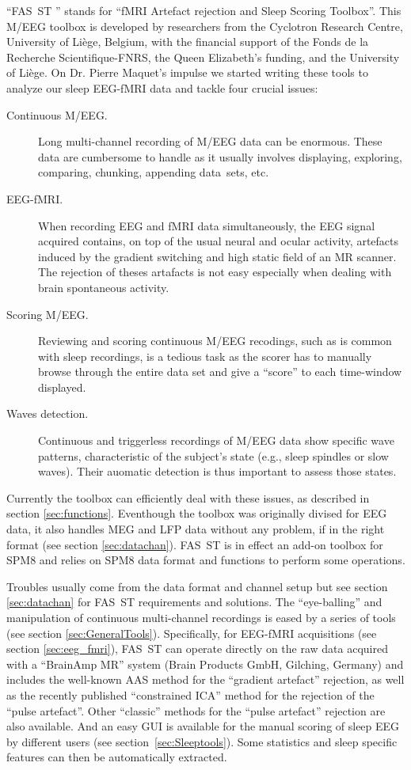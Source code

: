 \documentclass[a4paper,titlepage]{article}
\def\dblS{\hbox{S\hskip -4.5pt S}}
\newcommand{\fasst}{FA\dblS T } 	%
\begin{document}
``\fasst\hspace{-4pt}'' stands for ``fMRI Artefact rejection and Sleep Scoring Toolbox''. This M/EEG toolbox is developed by researchers from the Cyclotron Research Centre, University of Li\`ege, Belgium, with the financial support of the Fonds de la Recherche Scientifique-FNRS, the Queen Elizabeth's funding, and the University of Li\`ege.
On Dr. Pierre Maquet's impulse we started writing these tools to analyze our sleep EEG-fMRI data and tackle four crucial issues:
\begin{description}
	\item[Continuous M/EEG.]Long multi-channel recording of M/EEG data can be enormous. These data are cumbersome to handle as it usually involves displaying, exploring, comparing, chunking, appending data~sets, etc.
    \item[EEG-fMRI.]When recording EEG and fMRI data simultaneously, the EEG signal acquired contains, on top of the usual neural and ocular activity, artefacts induced by the gradient switching and high static field of an MR scanner. The rejection of theses artafacts is not easy especially when dealing with brain spontaneous activity.
    \item[Scoring M/EEG.]Reviewing and scoring continuous M/EEG recodings, such as is common with sleep recordings, is a tedious task as the scorer has to manually browse through the entire data set and give a ``score'' to each time-window displayed.
    \item[Waves detection.] Continuous and triggerless recordings of M/EEG data show specific wave patterns, characteristic of the subject's state (e.g., sleep spindles or slow waves). Their auomatic detection is thus important to assess those states.
\end{description}
Currently the toolbox can efficiently deal with these issues, as described in section \ref{sec:functions}. Eventhough the toolbox was originally divised for EEG data, it also handles MEG and LFP data without any problem, if in the right format (see section \ref{sec:datachan}). 
\fasst is in effect an add-on toolbox for SPM8\cite{SPM8,Litvak2011} and relies on SPM8 data format and functions to perform some operations.

Troubles usually come from the data format and channel setup but see section \ref{sec:datachan} for \fasst requirements and solutions. The ``eye-balling'' and manipulation of continuous multi-channel recordings is eased by a series of tools (see section \ref{sec:GeneralTools}).
Specifically, for EEG-fMRI acquisitions (see section \ref{sec:eeg_fmri}), \fasst can operate directly on the raw data acquired with a ``BrainAmp MR'' system (Brain Products GmbH, Gilching, Germany) and includes the well-known AAS method\cite{Allen2000} for the ``gradient artefact'' rejection, as well as the recently published ``constrained ICA'' method\cite{Leclercq2009} for the rejection of the ``pulse artefact''. Other ``classic'' methods for the ``pulse artefact'' rejection are also available. And an easy GUI is available for the manual scoring of sleep EEG by different users (see section~\ref{sec:Sleeptools}). Some statistics and sleep specific features can then be automatically extracted.
\end{document}
